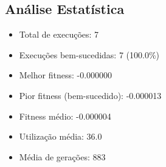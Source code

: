 \subsection{Análise Estatística}

\begin{itemize}
\item Total de execuções: 7
\item Execuções bem-sucedidas: 7 (100.0\%)
\item Melhor fitness: -0.000000
\item Pior fitness (bem-sucedido): -0.000013
\item Fitness médio: -0.000004
\item Utilização média: 36.0%
\item Média de gerações: 883
\end{itemize}